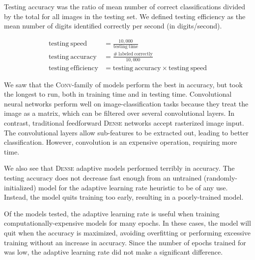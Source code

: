 \documentclass{article}
\begin{document}
Testing accuracy was the ratio of mean number of correct classifications divided by the total
for all images in the testing set.
We defined testing efficiency as the mean number of digits identified correctly per second (in digits/second).

\begin{align}
  \mathrm{testing~speed} &= \frac{10,000}{\mathrm{testing~time}} \\
  \mathrm{testing~accuracy} &= \frac{\mathrm{\#~labeled~correctly}}{10,000} \\
  \mathrm{testing~efficiency} &= \mathrm{testing~accuracy} \times \mathrm{testing~speed}
\end{align}

We saw that the \textsc{Conv}-family of models perform the best in accuracy,
but took the longest to run, both in training time and in testing time.
Convolutional neural networks perform well on image-classification tasks
because they treat the image as a matrix, which can be filtered over several convolutional layers.
In contrast, traditional feedforward \textsc{Dense} networks accept rasterized image input.
The convolutional layers allow sub-features to be extracted out, leading to better classification.
However, convolution is an expensive operation, requiring more time.

We also see that \textsc{Dense} adaptive models performed terribly in accuracy.
The testing accuracy does not decrease fast enough from an untrained (randomly-initialized) model
for the adaptive learning rate heuristic to be of any use.
Instead, the model quits training too early, resulting in a poorly-trained model.

Of the models tested, the adaptive learning rate is useful when training computationally-expensive
models for many epochs.
In these cases, the model will quit when the accuracy is maximized,
avoiding overfitting or performing excessive training without an increase in accuracy.
Since the number of epochs trained for was low, the adaptive learning rate
did not make a significant difference.
\end{document}
